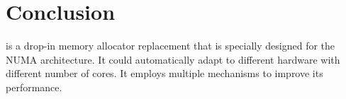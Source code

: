 \section*{Conclusion}
\label{sec:conclusion}

\NM{} is a drop-in memory allocator replacement that is specially designed for the NUMA architecture. It could automatically adapt to different hardware with different number of cores. It employs multiple mechanisms to improve its performance. 